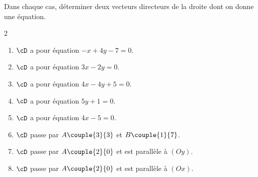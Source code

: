 Dans chaque cas, déterminer deux vecteurs directeurs de la droite dont on donne une équation.
\vspace{-6pt}
\setlength{\columnsep}{1cm}
\setlength{\columnseprule}{0pt}
\begin{multicols}{2}
\begin{enumerate}
\item $\cD$ a pour équation $-x+4y-7=0$.
\smallskip
\item $\cD$ a pour équation $3x-2y=0$.
\smallskip
\item $\cD$ a pour équation $4x-4y+5=0$.
\smallskip
\item $\cD$ a pour équation $5y+1=0$.
\smallskip
\item $\cD$ a pour équation $4x-5=0$.
\smallskip
\item $\cD$ passe par $A\couple{3}{3}$ et $B\couple{1}{7}$.
\smallskip
\item $\cD$ passe par $A\couple{2}{0}$ et est parallèle à $(Oy)$.
\smallskip
\item $\cD$ passe par $A\couple{2}{0}$ et est parallèle à $(Ox)$.
\end{enumerate}
\end{multicols}
\vspace{-6pt}

\exo

